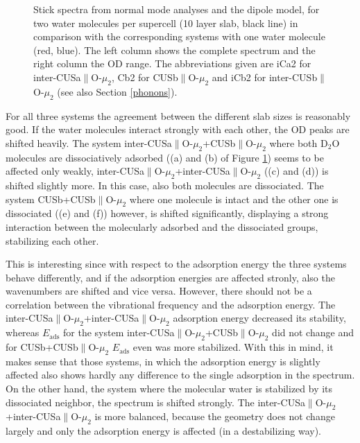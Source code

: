 \documentclass[11pt,DIV=13,BCOR=5mm,a4paper,headinclude]{scrbook}
\begin{document}
\begin{figure}[!h]
             \quad
{}
\caption{Stick spectra from normal mode analyses and the dipole model, for two water molecules per supercell (10 layer slab, black line) in comparison with the corresponding systems with one water molecule (red, blue).
The left column shows the complete spectrum and the right column the OD range.
The abbreviations given are iCa2 for inter-CUSa$\parallel$O-$\mu_2$, Cb2 for CUSb$\parallel$O-$\mu_2$ and iCb2 for inter-CUSb$\parallel$O-$\mu_2$ (see also Section \ref{phonons}).}
            \label{abb:2water_comp}
\end{figure}
For all three systems the agreement between the different slab sizes is reasonably good.
If the water molecules interact strongly with each other, the OD peaks are shifted heavily.
The system inter-CUSa$\parallel$O-$\mu_2$+CUSb$\parallel$O-$\mu_2$ where both D$_2$O molecules are dissociatively adsorbed ((a) and (b) of Figure \ref{abb:2water_comp}) seems to be affected only weakly, inter-CUSa$\parallel$O-$\mu_2$+inter-CUSa$\parallel$O-$\mu_2$ ((c) and (d)) is shifted slightly more.
In this case, also both molecules are dissociated.
The system CUSb+CUSb$\parallel$O-$\mu_2$ where one molecule is intact and the other one is dissociated ((e) and (f)) however, is shifted  significantly, displaying a strong interaction between the molecularly adsorbed and the dissociated groups, stabilizing each other.

This is interesting since with respect to the adsorption energy the three systems behave differently, and if the adsorption energies are affected stronly, also the wavenumbers are shifted and vice versa.
However, there should not be a correlation between the vibrational frequency and the adsorption energy.
The inter-CUSa$\parallel$O-$\mu_2$+inter-CUSa$\parallel$O-$\mu_2$ adsorption energy decreased its stability, whereas $E_\textrm{ads}$ for the system inter-CUSa$\parallel$O-$\mu_2$+CUSb$\parallel$O-$\mu_2$ did not change and for CUSb+CUSb$\parallel$O-$\mu_2$ $E_\textrm{ads}$ even was more stabilized.
With this in mind, it makes sense that those systems, in which the adsorption energy is slightly affected also shows hardly any difference to the single adsorption in the spectrum.
On the other hand, the system where the molecular water is stabilized by its dissociated neighbor, the spectrum is shifted strongly.
The inter-CUSa$\parallel$O-$\mu_2$+inter-CUSa$\parallel$O-$\mu_2$ is more balanced, because the geometry does not change largely and only the adsorption energy is affected (in a destabilizing way).
\end{document}
